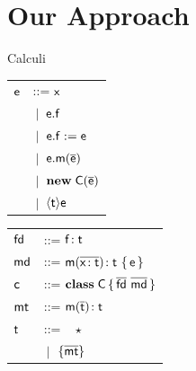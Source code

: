 \documentclass{beamer}
\newcommand{\fd}{\M{\xt{fd}}}
\newcommand{\md}{\M{\xt{md}}}
\newcommand{\mt}{\M{\xt{mt}}}
\newcommand{\m}{\M{\xt{m}}}
\newcommand{\e}{\M{\xt{e}}}
\newcommand{\f}{\M{\xt{f}}}
\newcommand{\x}{\M{\xt{x}}}
\renewcommand{\t}{\M{\xt{t}}}
\renewcommand{\c}{\M{\xt{c}}}
\newcommand{\C}{\M{\xt{C}}}
\newcommand{\new}{\M{\bt{new}}}
\newcommand{\Get}[2]{\M{#1.#2}}
\newcommand{\Set}[3]{\M{#1.#2:=#3}}
\newcommand{\Call}[3]{\M{#1.#2(#3)}}
\newcommand{\New}[2]{\M{\new\;#1({#2})}}
\newcommand{\Cast}[2]{\M{\langle{#1}\rangle{#2}}}
\newcommand{\any}{\M{\star}}
\newcommand{\Type}[1]{\M{\{ #1 \}}}
\newcommand{\HT}[2]{\M{{#1}\!:{#2}}}
\newcommand{\Mdef}[5]{\M{ \HT { #1( \b{\HT{#2}{#3}})}{#4}~ \{\, {#5} \,\} }}
\newcommand{\Ftype}[2]{\M{ \HT{#1}{#2} }}
\newcommand{\Mtype}[3]{\M{ \HT { #1( #2 )}{#3}}}
\newcommand{\Class}[3]{\M{\bt{class}\;#1\,\{\, #2 ~ #3\, \}}}
\newcommand{\Alt}[1]{ &\B #1 \\}
\newcommand{\B}{\M{~|~}}
\newcommand{\M}[1]{\ensuremath{#1}\xspace}
\newcommand{\xt}[1]{{\sf{#1}}\xspace}
\newcommand{\bt}[1]{\xt{\bf #1}}
\renewcommand{\b}[1]{\M{\overline{#1}}}
\begin{document}
  \section{Our Approach}
  \begin{frame}{Calculi}
  \center\begin{minipage}{4cm}\begin{tabular}{l@{~~~}l}
\e &::=  \x \\
   \Alt{ \Get\e\f }
   \Alt{ \Set\e\f\e }
   \Alt{ \Call\e\m{\b\e} }
   \Alt{ \New\C{\b\e} }
   \Alt{ \Cast\t\e }
\end{tabular}\end{minipage}\begin{minipage}{4cm}\begin{tabular}{l@{~~~}l}
\fd &::= 
    \Ftype\f\t   \\
\md &::=
    \Mdef\m\x\t\t\e \\
\c &::= \Class \C {\b{\fd}}{\b{\md} } \\
\mt &::= \Mtype\m{\b\t}\t\\
\t &::= ~ \any \\
   \Alt{ \Type{  \b{ \mt } } }
\end{tabular}\end{minipage}
\end{frame}
\end{document}
